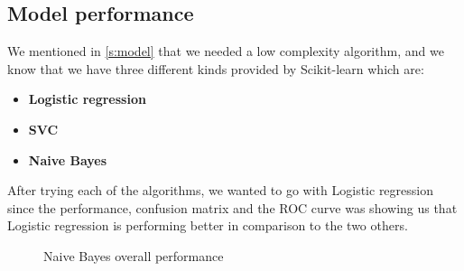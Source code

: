 \subsection{Model performance}
We mentioned in \ref{s:model} that we needed a low complexity algorithm, and we know that we have three different kinds
provided by Scikit-learn which are:
\begin{itemize}
	\item \textbf{Logistic regression}
	\item \textbf{SVC}
	\item \textbf{Naive Bayes}
\end{itemize}
After trying each of the algorithms, we wanted to go with Logistic regression since the performance, confusion matrix
and the ROC curve was showing us that Logistic regression is performing better in comparison to the two others.
\\[5pt]
\begin{figure}[H]
	\centering
	\hspace{5pt}
	\hspace{5pt}
	\caption{Naive Bayes overall performance}
	\label{fig:naive_bayes_perf}
\end{figure}
